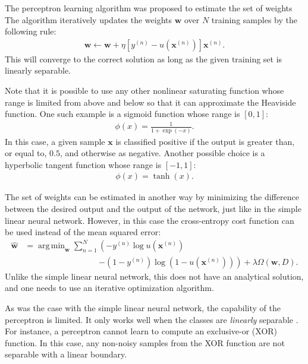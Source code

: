\documentclass{now}
\newcommand{\vect}[1]{\mathbf{#1}}
\newcommand{\vx}[0]{\vect{x}}
\newcommand{\vw}[0]{\vect{w}}
\DeclareMathOperator*{\argmin}{arg\,min}
\begin{document}
The perceptron learning algorithm was proposed  to estimate
the set of weights
The algorithm iteratively updates the
weights $\vw$ over $N$ training samples by the following
rule:
\begin{align*}
    \vw \leftarrow \vw + \eta \left[ y^{(n)} -
    u\left(\vx^{(n)}\right)
    \right] \vx^{(n)}.
\end{align*}
This will converge to the correct solution as long as the
given training set is linearly separable.

Note that it is possible to use any other nonlinear saturating
function whose range is limited from above and below so that it
can approximate the Heaviside function. One such example is a
sigmoid function whose range is
$\left[ 0, 1 \right]$:
\begin{align}
    \label{eq:sigmoid}
    \phi(x) = \frac{1}{1 + \exp\left( -x\right)}.
\end{align}
In this case, a given sample $\vx$ is classified positive if
the output is greater than, or equal to, $0.5$, and
otherwise as negative. 
Another possible choice is a
hyperbolic tangent function whose range is $\left[ -1, 1
\right]$:
\begin{align}
    \label{eq:tanh}
    \phi(x) = \tanh(x).
\end{align}

The set of weights can be estimated in another way by
minimizing the difference between the desired output and the
output of the network, just like in the simple linear neural
network. However, in this case the cross-entropy cost
function \citep[see, e.g.][]{Bishop2006} can be used instead
of the mean squared error:
\begin{align}
    \label{eq:crossentropy_cost}
    \hat{\vw} &= \argmin_{\vw} \sum_{n=1}^N \left(-y^{(n)}
    \log u\left(\vx^{(n)}\right)\right.
    \nonumber\\
    &\phantom{= \argmin_{\vw} \sum_{n=1}^N}\left.-\left(1-y^{(n)}\right)
    \log\left( 1 - 
    u\left(\vx^{(n)}\right)\right)\right) 
    + \lambda \Omega
    \left(\vw, D\right).
\end{align}
Unlike the simple linear neural network, this does not have
an analytical solution, and one needs to use an iterative
optimization algorithm.

As was the case with the simple linear neural network, the
capability of the perceptron is limited. It only works well
when the classes are \textit{linearly} separable \citep[see,
e.g.,][]{Minsky1969}. For instance, a perceptron cannot
learn to compute an exclusive-or
(XOR) function. In this
case, any non-noisy samples from the XOR function are not
separable with a linear boundary.
\end{document}

